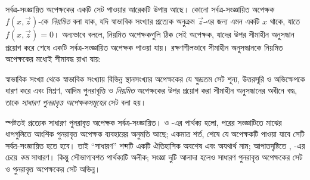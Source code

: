 \documentclass[../../../include/open-logic-section]{subfiles}
\begin{document}

সর্বত্র-সংজ্ঞায়িত অপেক্ষকের একটি সেট পাওয়ার আরেকটি উপায় আছে। কোনো
সর্বত্র-সংজ্ঞায়িত অপেক্ষক $f(x,\vec z)$-কে \emph{নিয়মিত} বলা যাক,
যদি স্বাভাবিক সংখ্যার প্রত্যেক অনুক্রম $\vec z$-এর জন্য এমন একটি $x$
থাকে, যাতে $f(x,\vec z) = 0$। অন্যভাবে বললে, নিয়মিত অপেক্ষকগুলি ঠিক
সেই অপেক্ষক, যাদের উপর সীমাহীন অনুসন্ধান প্রয়োগ করে শেষে একটি
সর্বত্র-সংজ্ঞায়িত অপেক্ষক পাওয়া যায়। রক্ষণশীলভাবে সীমাহীন অনুসন্ধানকে
নিয়মিত অপেক্ষকের মধ্যেই সীমাবদ্ধ রাখা যায়:

\begin{defn}
স্বাভাবিক সংখ্যা থেকে স্বাভাবিক সংখ্যায় বিভিন্ন স্থানসংখ্যার অপেক্ষকের
যে ক্ষুদ্রতম সেট শূন্য, উত্তরসূরি ও অভিক্ষেপকে ধারণ করে এবং মিশ্রণ, আদিম
পুনরাবৃত্তি ও \emph{নিয়মিত} অপেক্ষকের উপর প্রয়োগ করা সীমাহীন অনুসন্ধানের
অধীনে বদ্ধ, তাকে \emph{সাধারণ পুনরাবৃত্ত অপেক্ষকসমূহের} সেট বলা হয়।
\end{defn}

স্পষ্টতই প্রত্যেক সাধারণ পুনরাবৃত্ত অপেক্ষক সর্বত্র-সংজ্ঞায়িত।
 ও -এর
পার্থক্য হলো, পরের সংজ্ঞাটিতে মাঝের ধাপগুলিতে আংশিক পুনরাবৃত্ত অপেক্ষক
ব্যবহারের অনুমতি আছে; একমাত্র শর্ত, শেষে যে অপেক্ষকটি পাওয়া যাবে সেটি
সর্বত্র-সংজ্ঞায়িত হতে হবে। তাই “সাধারণ” শব্দটি একটি ঐতিহাসিক অবশেষ এবং
অযথার্থ নাম; আপাতদৃষ্টিতে ,
-এর চেয়ে \emph{কম} সাধারণ। কিন্তু সৌভাগ্যবশত
পার্থক্যটি অলীক; সংজ্ঞা দুটি আলাদা হলেও সাধারণ পুনরাবৃত্ত অপেক্ষকের সেট
ও পুনরাবৃত্ত অপেক্ষকের সেট অভিন্ন।
\end{document}
